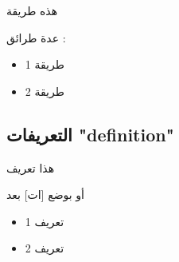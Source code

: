 \documentclass[12pt,a4paper]{mathbook_arabic}
\newcommand\ee{\textenglish}
\begin{document}
\begin{minipage}{.4\textwidth}
\begin{methode}
هذه طريقة
\end{methode}

\begin{methode} 
عدة طرائق :\par
\begin{itemize}
\item طريقة 1
\item طريقة 2
\end{itemize}
\end{methode}
\end{minipage}
\qquad
\begin{minipage}{.4\textwidth}
\end{minipage}



\subsection{التعريفات \ee{"definition"}}



\begin{definition}
هذا تعريف
\end{definition}


أو بوضع [ات] بعد 
\LR{\begin{lstlisting}
\begin{definition}[]
\end{lstlisting}}

\begin{definition}[ات]
\begin{itemize}
\item[] تعريف 1
\item[] تعريف 2
\end{itemize}

\end{definition}
\end{document}
